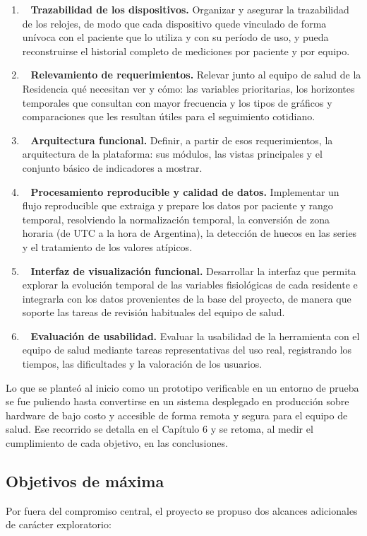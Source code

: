 \begin{enumerate}
\item~ \textbf{Trazabilidad de los dispositivos.} Organizar y asegurar la trazabilidad de los relojes, de modo que cada dispositivo quede vinculado de forma unívoca con el paciente que lo utiliza y con su período de uso, y pueda reconstruirse el historial completo de mediciones por paciente y por equipo.
\item~ \textbf{Relevamiento de requerimientos.} Relevar junto al equipo de salud de la Residencia qué necesitan ver y cómo: las variables prioritarias, los horizontes temporales que consultan con mayor frecuencia y los tipos de gráficos y comparaciones que les resultan útiles para el seguimiento cotidiano.
\item~ \textbf{Arquitectura funcional.} Definir, a partir de esos requerimientos, la arquitectura de la plataforma: sus módulos, las vistas principales y el conjunto básico de indicadores a mostrar.
\item~ \textbf{Procesamiento reproducible y calidad de datos.} Implementar un flujo reproducible que extraiga y prepare los datos por paciente y rango temporal, resolviendo la normalización temporal, la conversión de zona horaria (de UTC a la hora de Argentina), la detección de huecos en las series y el tratamiento de los valores atípicos.
\item~ \textbf{Interfaz de visualización funcional.} Desarrollar la interfaz que permita explorar la evolución temporal de las variables fisiológicas de cada residente e integrarla con los datos provenientes de la base del proyecto, de manera que soporte las tareas de revisión habituales del equipo de salud.
\item~ \textbf{Evaluación de usabilidad.} Evaluar la usabilidad de la herramienta con el equipo de salud mediante tareas representativas del uso real, registrando los tiempos, las dificultades y la valoración de los usuarios.
\end{enumerate}
Lo que se planteó al inicio como un prototipo verificable en un entorno de prueba se fue puliendo hasta convertirse en un sistema desplegado en producción sobre hardware de bajo costo y accesible de forma remota y segura para el equipo de salud. Ese recorrido se detalla en el Capítulo 6 y se retoma, al medir el cumplimiento de cada objetivo, en las conclusiones.\\


\subsection{Objetivos de máxima}
Por fuera del compromiso central, el proyecto se propuso dos alcances adicionales de carácter exploratorio:\\



